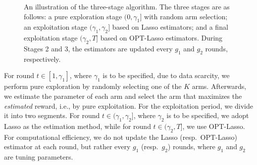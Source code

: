 \documentclass[aos,preprint]{imsart}
\theoremstyle{plain}
\theoremstyle{definition}
\begin{document}
 

 

\begin{figure}[!t]
\centering
{}
\caption{An illustration of the three-stage algorithm. The three stages are as follows: a pure exploration stage $(0, \gamma_1]$ with random arm selection; an exploitation stage $(\gamma_1, \gamma_2]$ based on Lasso estimators; and a final exploitation stage $(\gamma_2, T]$ based on OPT-Lasso estimators. During Stages 2 and 3, the estimators are updated every $g_1$ and $g_2$ rounds, respectively.}
\label{fig:proposed_three_stages}
\end{figure}

For round $t \in [1, \gamma_1]$, where $\gamma_1$ is to be specified, due to data scarcity, we perform pure exploration by randomly selecting one of the $K$ arms. Afterwards, we estimate the parameter of each arm and select the arm that maximizes the \textit{estimated} reward, i.e., by pure exploitation. For the exploitation period, we divide it into two segments. For round $t \in (\gamma_1, \gamma_2]$, where $\gamma_2$ is to be specified, we adopt Lasso as the estimation method, while for round $t \in (\gamma_2, T]$, we use OPT-Lasso. For computational efficiency, we do not update the Lasso (resp.~OPT-Lasso) estimator at each round, but rather every $g_1$ (resp.~$g_2$) rounds, where $g_1$ and $g_2$ are tuning parameters.
\end{document}
